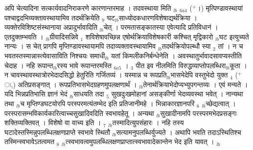 \documentclass[article,12pt,a4paper]{memoir}%
\newcommand{\add}[1]{($^{+}$#1)}
\newcounter{parCount}
\begin{document}
	  
	  \pstart \leavevmode%
	\hphantom{.}अपि चेत्यादिना सत्कार्यवादनिराकरणे कारणान्तरमाह । {\color{DodgerBlue3}तदवस्थाया} मिति {\tiny $_{lb}$} {\tiny $_{6a4}$} \add{।} मृत्पिण्डावस्थायां पश्चाद्वदभिव्यक्तावस्थायामिव तदर्थक्रियेति {\tiny $_{9}$} \leavevmode{} घट{\tiny $_{lb}$}साध्योदकधारणविशेषाद्यर्थक्रिया । व्यक्तेरविशिष्टसंस्थानाया अप्रादुर्भावादिति {\tiny $_{lb}$}चेत् । परमतासङ्कातस्या एवेत्यादि प्रतिविधानं । एतदुक्तम्भवति । {\tiny $_{lb}$}ग्रीवादिसन्निवे {\tiny $_{1}$} शविशेषावच्छिन्न एषोर्थक्रियाविशेषकारी कश्चित् मृद्विकारो {\tiny $_{lb}$}घट इत्युच्यते नान्यः । स चेत् प्रागपि मृप्तिण्डावस्थायामपि तदाव्यक्तावस्थायामिव {\tiny $_{lb}$}तदर्थक्रियोपल्ब्धौ स्या {\tiny $_{2}$} तां । न च भवतस्तस्मान्नास्त्येवासाविति निश्चयः समाधी{\tiny $_{lb}$} \leavevmode{} यतां किमलीकनिर्बन्धेनेति । अवस्थातुर्भावादसावप्यस्तीति चेदाह । {\color{DodgerBlue3}नहि रूपान्त{\tiny $_{lb}$}रस्य भावे रूपान्तरमस्ति} {\tiny $_{6a5}$} । {\tiny $_{3}$} पीत इव नीलमिति विरुद्धव्याप्तोपलब्धिरा{\tiny $_{lb}$}कूता । न चावस्थावस्थात्रोरभेदादसिद्धो हेतुरिति गर्जितव्यं । यस्मान्न च रूपप्रति{\tiny $_{lb}$}भासभेदेपि वस्तुभेदो युक्त {\tiny $_{4}$} \add{ः,} अतिप्रसङ्गात् । रूपप्रतिभासभेदग्रहणमुपलक्षणार्थं । {\tiny $_{lb}$}तेनार्थक्रियाभेदोप्यभ्युपगन्तव्यः । एवं मन्यते । यदि भिन्नप्रतिभासि ज्ञानं भेदं {\tiny $_{lb}$}साधयति तदा {\tiny $_{5}$} सुखदुःखमोहानां असङ्कीर्णा भेदव्यवस्था भवेत् । नान्यथा तथा {\tiny $_{lb}$}च मृप्तिण्डघटयोरपि परस्परमत्यंतम्भेद इति प्रतिजानीमहे । भिन्नाकारज्ञानपरि {\tiny $_{6}$} {\tiny $_{lb}$}च्छेद्यत्वात् । परस्परासम्भविकार्यकारित्वाच्चसुखादिवदिति स्वभावहेतू । अन्यथा {\tiny $_{lb}$}सुखादीनामपि परस्परमभेदप्रसङ्गः शक्तिव्यक्तिवत् । विशेषो वा वाच्य इति । {\tiny $_{7}$} {\tiny $_{lb}$}तस्मादित्युपसंहारः । नहि तस्य घटादेस्तस्मिन्नुपलब्धिलक्षणप्राप्ते स्वभावे स्थितौ {\tiny $_{lb}$}सत्यामनुपलब्धिर्युज्यते । अथापि भवति तदाऽस्थितिश्च तस्मिन्स्वभावेऽतत्वमत {\tiny $_{8}$} {\tiny $_{lb}$}त्स्वभावत्वमुपलब्धिलक्षणप्राप्तात्स्वभावादेकान्तेन भेद इति यावत् ।
	{}
	\pend%
      {\tiny $_{lb}$}
\end{document}
